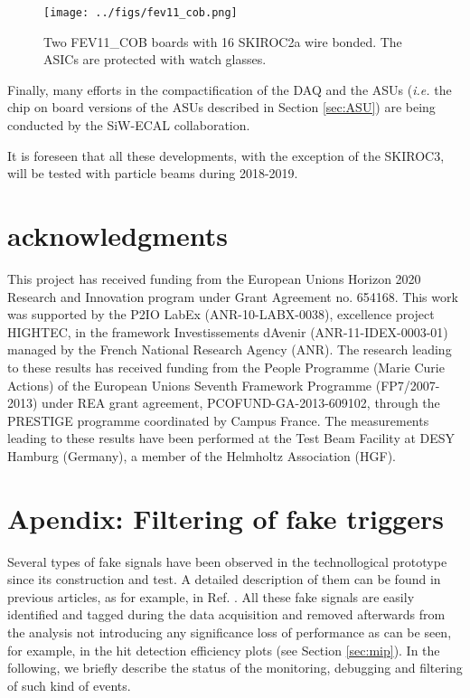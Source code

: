 \documentclass[final,3p,times,twocolumn]{elsarticle}
\begin{document}
\begin{figure}[!t]
  \centering
    \texttt{[image: ../figs/fev11\_cob.png]} 
  \caption{Two FEV11\_COB boards with 16 SKIROC2a wire bonded. The ASICs are protected with watch glasses.}
\label{cob}
\end{figure}

Finally, many efforts in the compactification of
the DAQ and the ASUs ({\it i.e.} the chip on board versions of the 
ASUs described in Section \ref{sec:ASU}) are being
conducted by the SiW-ECAL collaboration.

It is foreseen that all these developments, with the exception of the SKIROC3, will be tested with particle beams during 2018-2019.


\section*{acknowledgments}

This project has received funding from the European Union{\textquotesingle}s Horizon 2020 Research and Innovation program under Grant Agreement no. 654168.
This work was supported by the P2IO LabEx (ANR-10-LABX-0038), excellence project HIGHTEC,
in the framework {\textquotesingle}Investissements d{\textquotesingle}Avenir{\textquotesingle}
(ANR-11-IDEX-0003-01) managed by the French National Research Agency (ANR).
The research leading to these results has received funding from the People Programme (Marie
Curie Actions) of the European Union{\textquotesingle}s Seventh Framework Programme (FP7/2007-2013)
under REA grant agreement, PCOFUND-GA-2013-609102, through the PRESTIGE
programme coordinated by Campus France.
The measurements leading to these results have been performed at the Test Beam Facility at DESY Hamburg (Germany), a member of the Helmholtz Association (HGF).

\appendix
\section{Apendix: Filtering of fake triggers}
\label{sec:retriggers}

Several types of fake signals have been observed in the technollogical prototype since its construction and test. A detailed description of them
can be found in previous articles, as for example, in Ref. \cite{Amjad:2014tha}. All these fake signals are easily identified
and tagged during the data acquisition and removed afterwards from the analysis
not introducing any significance loss of performance as can be seen, for example, in the hit detection efficiency plots (see Section \ref{sec:mip}).
In the following, we briefly describe the status of the monitoring, debugging and filtering
of such kind of events.
\end{document}
